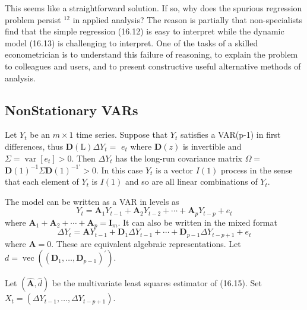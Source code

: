 \documentclass[10pt]{article}
\begin{document}
This seems like a straightforward solution. If so, why does the spurious regression problem persist ${ }^{12}$ in applied analysis? The reason is partially that non-specialists find that the simple regression (16.12) is easy to interpret while the dynamic model (16.13) is challenging to interpret. One of the tasks of a skilled econometrician is to understand this failure of reasoning, to explain the problem to colleagues and users, and to present constructive useful alternative methods of analysis.

\subsection{NonStationary VARs}
Let $Y_{t}$ be an $m \times 1$ time series. Suppose that $Y_{t}$ satisfies a VAR(p-1) in first differences, thus $\boldsymbol{D}(\mathrm{L}) \Delta Y_{t}=$ $e_{t}$ where $\boldsymbol{D}(z)$ is invertible and $\Sigma=\operatorname{var}\left[e_{t}\right]>0$. Then $\Delta Y_{t}$ has the long-run covariance matrix $\Omega=$ $\boldsymbol{D}(1)^{-1} \Sigma \boldsymbol{D}(1)^{-1 \prime}>0$. In this case $Y_{t}$ is a vector $I(1)$ process in the sense that each element of $Y_{t}$ is $I(1)$ and so are all linear combinations of $Y_{t}$.

The model can be written as a VAR in levels as
$$
Y_{t}=\boldsymbol{A}_{1} Y_{t-1}+\boldsymbol{A}_{2} Y_{t-2}+\cdots+\boldsymbol{A}_{p} Y_{t-p}+e_{t}
$$
where $\boldsymbol{A}_{1}+\boldsymbol{A}_{2}+\cdots+\boldsymbol{A}_{p}=\boldsymbol{I}_{m}$. It can also be written in the mixed format
$$
\Delta Y_{t}=\boldsymbol{A} Y_{t-1}+\boldsymbol{D}_{1} \Delta Y_{t-1}+\cdots+\boldsymbol{D}_{p-1} \Delta Y_{t-p+1}+e_{t}
$$
where $\boldsymbol{A}=0$. These are equivalent algebraic representations. Let $d=\operatorname{vec}\left(\left(\boldsymbol{D}_{1}, \ldots, \boldsymbol{D}_{p-1}\right)^{\prime}\right)$.

Let $(\widehat{\boldsymbol{A}}, \widehat{d})$ be the multivariate least squares estimator of (16.15). Set $X_{t}=\left(\Delta Y_{t-1}, \ldots, \Delta Y_{t-p+1}\right)$.
\end{document}
